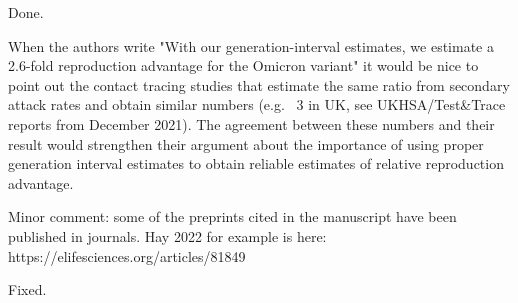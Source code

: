 \documentclass[12pt]{article}
\newcommand{\revtext}{\textsf}
\begin{document}
Done.

\revtext{When the authors write 
"With our generation-interval estimates, we estimate a 2.6-fold reproduction advantage for the Omicron variant" 
it would be nice to point out the contact tracing studies that estimate the same ratio from secondary attack rates and obtain similar numbers (e.g. ~3 in UK, see UKHSA/Test&Trace reports from December 2021). The agreement between these numbers and their result would strengthen their argument about the importance of using proper generation interval estimates to obtain reliable estimates of relative reproduction advantage.}



\revtext{Minor comment: some of the preprints cited in the manuscript have been published in journals. Hay 2022 for example is here: https://elifesciences.org/articles/81849}

Fixed.
\end{document}
